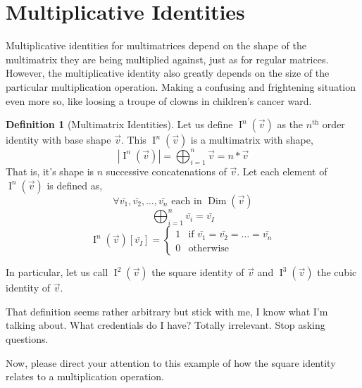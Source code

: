 \documentclass[12pt]{book}
\theoremstyle{plain}
\theoremstyle{definition}
\newtheorem{definition}{Definition}[chapter]
\theoremstyle{ppart}
\theoremstyle{case}
\theoremstyle{solution}
\DeclareMathOperator{\Dim}{Dim}
\DeclareMathOperator{\Ident}{I}
\newcommand{\shape}[1]{\left|#1\right|}
\begin{document}
\section{Multiplicative Identities}

Multiplicative identities for multimatrices depend on the shape of the
multimatrix they are being multiplied against, just as for regular matrices.
However, the multiplicative identity also greatly depends on the size of
the particular multiplication operation. Making a confusing and frightening
situation even more so, like loosing a troupe of clowns in children's cancer ward.

\begin{definition}[Multimatrix Identities]
\label{mm_mult_ident}
Let us define $\Ident^n(\vec{v})$ as the $n^{\text{th}}$ order identity with base shape
$\vec{v}$. This $\Ident^n(\vec{v})$ is a multimatrix with shape,
\[ \shape{\Ident^n(\vec{v})} = \bigoplus_{i = 1}^n \vec{v}  = n * \vec{v} \]
That is, it's shape is $n$ successive concatenations of $\vec{v}$.
Let each element of $\Ident^n(\vec{v})$ is defined as,
\[ \forall \bar{v_1}, \bar{v_2}, \ldots, \bar{v_n} \text{ each in } \Dim(\vec{v}) \]
\[ \bigoplus_{i = 1}^n \bar{v_i} = \bar{v_I} \]
\[
 \Ident^n(\vec{v})[\bar{v_I}]
 = \left\{
  \begin{array}{ll}
    1 & \mbox{if } \bar{v_1} = \bar{v_2} = \ldots = \bar{v_n} \\
    0 & \mbox{otherwise}
  \end{array}
 \right.
\]

In particular, let us call $\Ident^2(\vec{v})$ the square identity of $\vec{v}$ and
$\Ident^3(\vec{v})$ the cubic identity of $\vec{v}$.
\end{definition}

That definition seems rather arbitrary but stick with me, I know what I'm
talking about. What credentials do I have? Totally irrelevant. Stop asking questions.

Now, please direct your attention to this example of how the square identity relates
to a multiplication operation.
\end{document}
